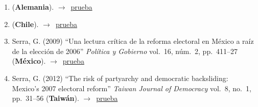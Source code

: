 \documentclass[12 pt, letter]{article}
\newenvironment{CitasMiTrabajo}{
    \begin{footnotesize}
    \begin{enumerate}[label={\footnotesize\emph{cita~\arabic*}},ref=\arabic*] %
        \setlength{\itemsep}{.1\itemsep}
        \setlength{\parskip}{.1\parskip}
    }{\end{enumerate}\end{footnotesize}}
\begin{document}
        \begin{CitasMiTrabajo}

        \item {} (\textbf{Alemania}). $\rightarrow$~\href{https://github.com/emagar/cv/blob/master/citasMiTrab/magarRomero2007rcp/heisig2015.pdf}{prueba}

        \item {} (\textbf{Chile}). $\rightarrow$~\href{https://github.com/emagar/cv/blob/master/citasMiTrab/magarRomero2007rcp/hdzhdzGeoespacialElecFCH2015.pdf}{prueba}

        \item Serra, G. (2009)
        ``Una lectura cr\'itica de la reforma electoral en M\'exico a ra\'iz de la elecci\'on de 2006''
        \emph{Pol\'itica y Gobierno} vol.\ 16, n\'um.\ 2, pp.\ 411--27
        (\textbf{M\'exico}). $\rightarrow$~\href{https://github.com/emagar/cv/blob/master/citasMiTrab/magarRomero2007rcp/serra2009pyg.pdf}{prueba}

        \item Serra, G. (2012)
            ``The risk of partyarchy and democratic backsliding: Mexico's 2007 electoral reform''
            \emph{Taiwan Journal of Democracy}
            vol.\ 8, no.\ 1, pp.\ 31--56 (\textbf{Taiw\'an}). $\rightarrow$~\href{https://github.com/emagar/cv/blob/master/citasMiTrab/estevezEtalElecStud/serraElecRefMexico2012tjd.pdf}{prueba}

        \label{ncites:magar.romero.rcp.2007} %

        \end{CitasMiTrabajo}



\end{document}
